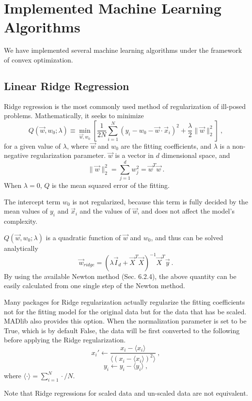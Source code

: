 \section{Implemented Machine Learning Algorithms}

We have implemented several machine learning algorithms under the
framework of convex optimization.

\subsection{Linear Ridge Regression}
Ridge regression is the most commonly used method of regularization of
ill-posed problems. Mathematically, it seeks to minimize
\begin{equation}
Q\left(\vec{w},w_0;\lambda\right)\equiv \min_{\vec{w},w_0}\left[ \frac{1}{2N} \sum_{i=1}^{N} \left( y_i - w_0 -
    \vec{w} \cdot \vec{x}_i \right)^2
  +\frac{\lambda}{2}\|\vec{w}\|_2^2 \right]\ ,
\end{equation}
for a given value of $\lambda$, where $\vec{w}$ and $w_0$ are the fitting coefficients, and $\lambda$
is a non-negative regularization parameter. $\vec{w}$ is a vector in
$d$ dimensional space, and
\begin{equation}
\|\vec{w}\|_2^2 = \sum_{j=1}^{d}w_j^2 = \vec{w}^T\vec{w}\ .
\end{equation}
When $\lambda = 0$, $Q$ is
the mean squared error of the fitting.

The intercept term $w_0$ is not regularized, because this term is
fully decided by the mean values of $y_i$ and $\vec{x}_i$ and the
values of $\vec{w}$, and does not affect the model's complexity.

$Q\left(\vec{w},w_0;\lambda\right)$ is a quadratic function of $\vec{w}$ and
  $w_0$, and thus can be solved analytically
\begin{equation}
\vec{w}_{ridge}=\left(\lambda\vec{I}_d +
  \vec{X}^T\vec{X}\right)^{-1}\vec{X}^T\vec{y}\ .
\end{equation}
By using the available Newton method (Sec. 6.2.4), the above quantity can be easily
calculated from one single step of the Newton method.

Many packages for Ridge regularization actually regularize the fitting
coefficients not for the fitting model for the original data but for
the data that has be scaled. MADlib also provides this option. When
the normalization parameter is set to be True, which is by default
False, the data will be first converted to the following before
applying the Ridge regularization.
\begin{equation}
  x_i' \leftarrow \frac{x_i - \langle x_i \rangle}{\langle (x_i -
    \langle x_i \rangle)^2\rangle} \ ,
\end{equation}
\begin{equation}
y_i \leftarrow y_i - \langle y_i \rangle \ ,
\end{equation}
where $\langle \cdot \rangle = \sum_{i=1}^{N} \cdot / N$.

Note that Ridge regressions for scaled data and un-scaled data are not equivalent.